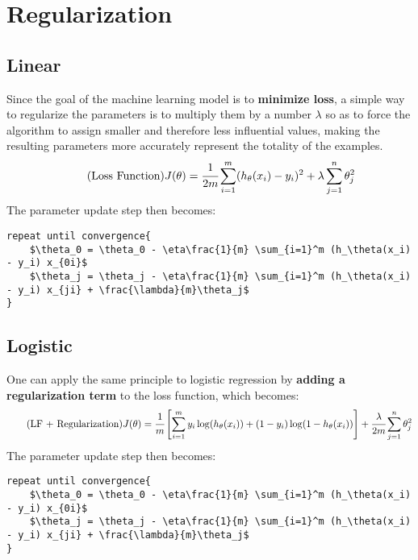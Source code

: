\section{Regularization}

\subsection{Linear}
Since the goal of the machine learning model is to \textbf{minimize loss}, a simple way to regularize the parameters is to multiply them by a number $\lambda$ so as to force the algorithm to assign smaller and therefore less influential values, making the resulting parameters more accurately represent the totality of the examples.
\begin{equation} \tag{Loss Function}
    J(\theta) = \cfrac{1}{2m} \sum_{i=1}^m (h_\theta(x_i) - y_i)^2 + \lambda \sum_{j=1}^n \theta_j^2
\end{equation}
The parameter update step then becomes:
\begin{lstlisting}[mathescape=true]
repeat until convergence{
    $\theta_0 = \theta_0 - \eta\frac{1}{m} \sum_{i=1}^m (h_\theta(x_i) - y_i) x_{0i}$
    $\theta_j = \theta_j - \eta\frac{1}{m} \sum_{i=1}^m (h_\theta(x_i) - y_i) x_{ji} + \frac{\lambda}{m}\theta_j$
}
\end{lstlisting}

\subsection{Logistic}
One can apply the same principle to logistic regression by \textbf{adding a regularization term} to the loss function, which becomes:
\begin{equation} \tag{LF + Regularization}
    J(\theta) = \cfrac{1}{m} \left[ \sum_{i=1}^m y_i \log(h_\theta(x_i)) + (1-y_i) \log(1-h_\theta(x_i)) \right] + \cfrac{\lambda}{2m} \sum_{j=1}^n \theta_j^2
\end{equation}
The parameter update step then becomes:
\begin{lstlisting}[mathescape=true]
repeat until convergence{
    $\theta_0 = \theta_0 - \eta\frac{1}{m} \sum_{i=1}^m (h_\theta(x_i) - y_i) x_{0i}$
    $\theta_j = \theta_j - \eta\frac{1}{m} \sum_{i=1}^m (h_\theta(x_i) - y_i) x_{ji} + \frac{\lambda}{m}\theta_j$
}
\end{lstlisting}

\newpage